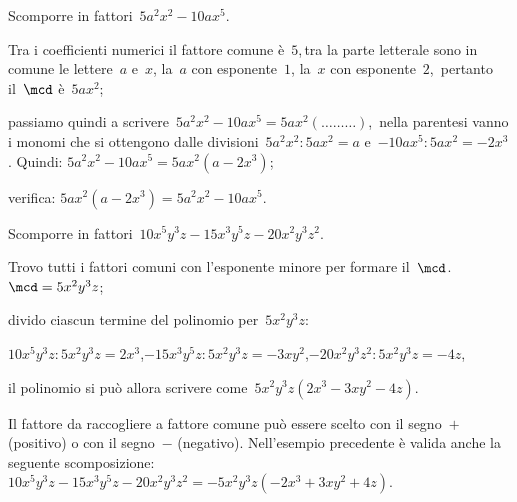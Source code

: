 \begin{exrig}
 \begin{esempio}
Scomporre in fattori~$5a^{2}x^{2}-10ax^{5}$.
  \begin{enumeratea}
  \item Tra i coefficienti numerici il fattore comune è~$5$,\,tra la parte letterale sono in comune le lettere~$a$ e~$x$, la~$a$ con esponente~$1$, la~$x$ con esponente~$2$,\, pertanto il~$\mcd$ è~$5ax^{2}$;
  \item passiamo quindi a scrivere~$5a^{2}x^{2}-10ax^{5}=5ax^{2}(\ldots \ldots \ldots)$,\, nella parentesi vanno i monomi che si ottengono dalle divisioni~$5a^{2}x^{2}:5ax^{2}=a$ e~$-10ax^{5}:5ax^{2}=-2x^{3}$. Quindi: $5a^{2}x^{2}-10ax^{5}=5ax^{2}(a-2x^{3})$;
  \item verifica: $5ax^{2}(a-2x^{3})=5a^{2}x^{2}-10ax^{5}$.
  \end{enumeratea}
 \end{esempio}

 \begin{esempio}
Scomporre in fattori~$10x^{5}y^{3}z-15x^{3}y^{5}z-20x^{2}y^{3}z^{2}$.
 \begin{enumeratea}
 \item Trovo tutti i fattori comuni con l'esponente minore per formare il~$\mcd$.\, $\mcd=5x^{2}y^{3}z$;
 \item divido ciascun termine del polinomio per~$5x^{2}y^{3}z$:
   \begin{description}
   \item $10x^{5}y^{3}z:5x^{2}y^{3}z=2x^{3}$,\quad$-15x^{3}y^{5}z:5x^{2}y^{3}z=-3xy^{2}$,\quad$-20x^{2}y^{3}z^{2}:5x^{2}y^{3}z=-4z$,
   \item il polinomio si può allora scrivere come~$5x^{2}y^{3}z (2x^{3}-3xy^{2}-4z)$.
   \end{description}
 \end{enumeratea}

Il fattore da raccogliere a fattore comune può essere scelto con il segno~$+$ (positivo) o con il segno~$−$ (negativo).
Nell'esempio precedente è valida anche la seguente 
scomposizione:~$10x^{5}y^{3}z-15x^{3}y^{5}z-20x^{2}y^{3}z^{2}=-5x^{2}y^{3}z (-2x^{3}+3xy^{2}+4z)$.
 \end{esempio}


\end{exrig}
